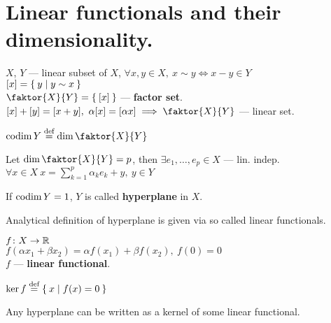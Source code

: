 \section{Linear functionals and their dimensionality.}
\begin{defn}
  $X$, $Y$ --- linear subset of $X$, $\forall x, y \in X,\ x \sim y \iff x - y
  \in Y$ \\
  $[x] = \Set{y | y \sim x}$ \\
  $\faktor{X}{Y} = \Set{[x]}$ --- \textbf{factor set}. \\
  $[x] + [y] = [x + y],\ \alpha [x] = [\alpha x] \implies \faktor{X}{Y}$ --- linear set.
\end{defn}
\begin{defn}
  $\codim{Y} \defeq \dim{\faktor{X}{Y}}$
\end{defn}

\begin{stm}
  Let $\dim{\faktor{X}{Y}} = p$, then $\exists e_1, \dotsc, e_p \in X$ --- lin. indep. \\
  $\forall x \in X\ x = \sum\limits_{k = 1}^p \alpha_k e_k + y,\ y \in Y$
\end{stm}

\noindent 
\begin{defn}
  If $\operatorname{codim}{Y} = 1$, $Y$ is called \textbf{hyperplane} in $X$.\\
\end{defn}

\noindent
Analytical definition of hyperplane is given via so called linear functionals.

\begin{defn}
  $f \colon X \to \mathbb{R}$  \\
  $f(\alpha x_1 + \beta x_2) = \alpha f(x_1) + \beta f(x_2),\ f(0) = 0$ \\
  $f$ --- \textbf{linear functional}.
\end{defn}

\begin{defn}
  $\ker{f} \overset{\text{def}}{=} \Set{x | f(x) = 0}$
\end{defn}

\begin{stm}
  Any hyperplane can be written as a kernel of some linear functional.
\end{stm}

